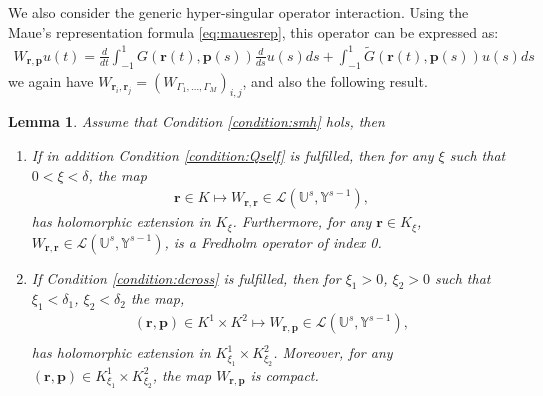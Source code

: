 \documentclass{article}
\newtheorem{lemma}[theorem]{Lemma}
\newcommand{\IU}{{\mathbb U}}
\newcommand{\IY}{{\mathbb Y}}
\newcommand{\bp}{{\bm p}}
\newcommand{\br}{\bm{r}}
\begin{document}
We also consider the generic hyper-singular operator interaction. Using the Maue's representation formula \eqref{eq:mauesrep}, this operator can be expressed as:
\begin{align*}
W_{\br,\bp} u (t)= \frac{d}{dt}
 \int_{-1}^1 G(\br(t),\bp(s))\frac{d}{ds}u(s) ds + \int_{-1}^1\widetilde{G}(\br(t),\bp(s))u(s)ds
 \end{align*}
we again have $W_{\br_i,\br_j} = (W_{\Gamma_1,\hdots,\Gamma_M})_{i,j}$, and also the following result.
\begin{lemma}
\label{lemma:wcomp} 
Assume that Condition \ref{condition:smh} hols, then
\begin{enumerate}
\item If in addition Condition \ref{condition:Qself} is fulfilled, then for any $\xi$ such that $0<\xi < \delta$, the map
\begin{align*}
\br \in K \mapsto W_{\br,\br} \in 
\mathcal{L}(\IU^s, \IY^{s-1}),
\end{align*}
has holomorphic extension in $K_\xi$. Furthermore, for any $\br \in K_\xi$, $W_{\br,\br} \in \mathcal{L}(\IU^s, \IY^{s-1})$, is a Fredholm operator of index 0.
\item 
If Condition \ref{condition:dcross} is fulfilled, then for $\xi_1 >0$, $\xi_2 >0$ such that $\xi_1 < \delta_1$, $\xi_2 < \delta_2$ the map,
 \begin{align*}
 (\br,\bp) \in K^1 \times K^2 \mapsto W_{\br,\bp} \in 
\mathcal{L}(\IU^s, \IY^{s-1}),\\
\end{align*}
has holomorphic extension in $K^1_{\xi_1} \times K^2_{\xi_2}$. Moreover, for any $(\br,\bp) \in K^1_{\xi_1} \times K^2_{\xi_2}$, the map $W_{\br,\bp}$ is compact. 
\end{enumerate}
\end{lemma}
\end{document}
